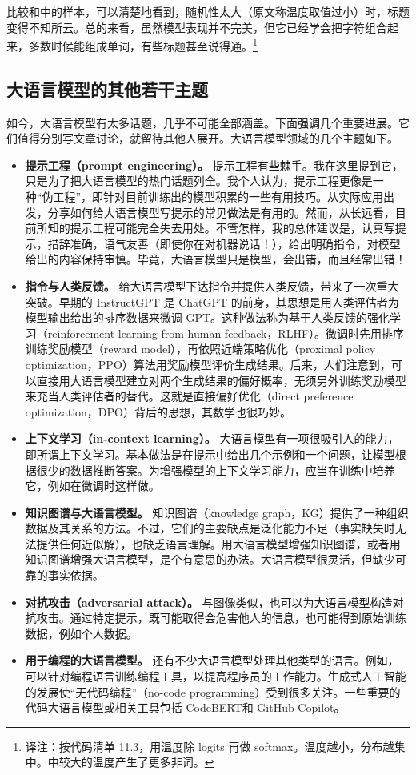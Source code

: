 比较和中的样本，可以清楚地看到，随机性太大（原文称温度取值过小）时，标题变得不知所云。总的来看，虽然模型表现并不完美，但它已经学会把字符组合起来，多数时候能组成单词，有些标题甚至说得通。\footnote{译注：按代码清单 11.3，用温度除 logits 再做 softmax。温度越小，分布越集中。中较大的温度产生了更多非词。}

\subsection{大语言模型的其他若干主题}
如今，大语言模型有太多话题，几乎不可能全部涵盖。下面强调几个重要进展。它们值得分别写文章讨论，就留待其他人展开。大语言模型领域的几个主题如下。
\begin{itemize}
\item \textbf{提示工程（prompt engineering）。} 提示工程有些棘手。我在这里提到它，只是为了把大语言模型的热门话题列全。我个人认为，提示工程更像是一种“伪工程”，即针对目前训练出的模型积累的一些有用技巧。从实际应用出发，分享如何给大语言模型写提示的常见做法是有用的。然而，从长远看，目前所知的提示工程可能完全失去用处。不管怎样，我的总体建议是，认真写提示，措辞准确，语气友善（即使你在对机器说话！），给出明确指令，对模型给出的内容保持审慎。毕竟，大语言模型只是模型，会出错，而且经常出错！
\item \textbf{指令与人类反馈。} 给大语言模型下达指令并提供人类反馈，带来了一次重大突破。早期的 InstructGPT 是 ChatGPT 的前身，其思想是用人类评估者为模型输出给出的排序数据来微调 GPT。这种做法称为基于人类反馈的强化学习（reinforcement learning from human feedback，RLHF）。微调时先用排序训练奖励模型（reward model），再依照近端策略优化（proximal policy optimization，PPO）算法用奖励模型评价生成结果。后来，人们注意到，可以直接用大语言模型建立对两个生成结果的偏好概率，无须另外训练奖励模型来充当人类评估者的替代。这就是直接偏好优化（direct preference optimization，DPO）背后的思想，其数学也很巧妙。
\item \textbf{上下文学习（in-context learning）。} 大语言模型有一项很吸引人的能力，即所谓上下文学习。基本做法是在提示中给出几个示例和一个问题，让模型根据很少的数据推断答案。为增强模型的上下文学习能力，应当在训练中培养它，例如在微调时这样做。
\item \textbf{知识图谱与大语言模型。} 知识图谱（knowledge graph，KG）提供了一种组织数据及其关系的方法。不过，它们的主要缺点是泛化能力不足（事实缺失时无法提供任何近似解），也缺乏语言理解。用大语言模型增强知识图谱，或者用知识图谱增强大语言模型，是个有意思的办法。大语言模型很灵活，但缺少可靠的事实依据。
\item \textbf{对抗攻击（adversarial attack）。} 与图像类似，也可以为大语言模型构造对抗攻击。通过特定提示，既可能取得会危害他人的信息，也可能得到原始训练数据，例如个人数据。
\item \textbf{用于编程的大语言模型。} 还有不少大语言模型处理其他类型的语言。例如，可以针对编程语言训练编程工具，以提高程序员的工作能力。生成式人工智能的发展使“无代码编程”（no-code programming）受到很多关注。一些重要的代码大语言模型或相关工具包括 CodeBERT和 GitHub Copilot。
\end{itemize}

